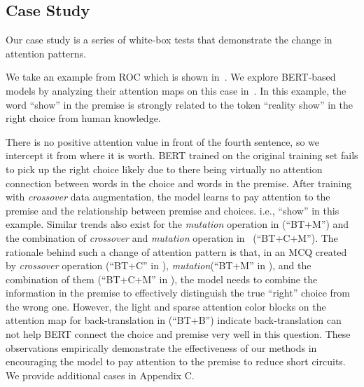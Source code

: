 \subsection{Case Study}
\label{sec:case}

Our case study is a series of white-box tests that demonstrate
the change in attention patterns.

We take an example from ROC which is shown in~.
We explore BERT-based models by 
analyzing their attention maps on this case in~.  
In this example, the word ``show'' in the premise is strongly
related to the token ``reality show'' in the right choice from human knowledge. 


There is no positive attention value in front of the fourth sentence, 
so we intercept it from where it is worth. 
BERT trained on the original training set fails 
to pick up the right choice likely due to there being 
virtually no attention connection between words in 
the choice and words in the premise.
After training with \textit{crossover} data augmentation, 
the model learns  
to pay attention to the premise and the relationship 
between premise and choices. 
i.e., ``show'' in this example. 
Similar trends also exist for the \textit{mutation} operation in  (``BT+M'')
and the combination of \textit{crossover} 
and \textit{mutation} operation in~ (``BT+C+M''). 
The rationale behind 
such a change of attention pattern is that, 
in an MCQ created by \textit{crossover} operation (``BT+C'' in ), 
\textit{mutation}(``BT+M'' in ), 
and the combination of them (``BT+C+M'' in ), 
the model needs to combine the information 
in the premise to effectively 
distinguish the true ``right'' choice from the wrong one. 
However, the light and sparse attention color blocks on the attention map for back-translation 
in  (``BT+B'') indicate back-translation 
can not help BERT connect the choice and premise very well in this question.
These observations empirically demonstrate the effectiveness of our methods 
in encouraging the model to pay attention to the premise to reduce 
short circuits. We provide additional cases in Appendix C. 


